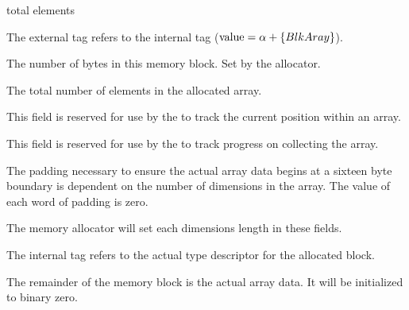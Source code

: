 \begin{TDfields}{total elements}
  \item[external tag] The external tag refers to the internal tag
    ($\textrm{value} = \alpha + \left\lbrace BlkAray \right\rbrace$).

  \item[block size] The number of bytes in this memory block.  Set by
    the allocator.

  \item[total elements] The total number of elements in the allocated
    array.

  \item[q.arrpos] This field is reserved for use by the \gc to track
    the current position within an array.

  \item[q.cnt] This field is reserved for use by the \gc to track
    progress on collecting the array.

  \item[padding] The padding necessary to ensure the actual array data
    begins at a sixteen byte boundary is dependent on the number of
    dimensions in the array.  The value of each word of padding is
    zero.

  \item[\texttt{LEN}] The memory allocator will set each dimensions
    length in these fields.

  \item[internal tag]  The internal tag refers to the actual type
    descriptor for the allocated block.

  \item[array data]  The remainder of the memory block is the actual
    array data.  It will be initialized to binary zero.
\end{TDfields}


